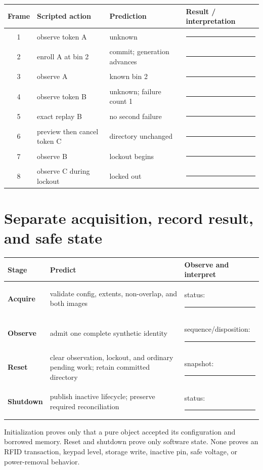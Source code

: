 \documentclass[11pt]{article}
\newcommand{\blankline}{\rule{0.9in}{0.4pt}}
\begin{document}
\begin{tabularx}{\linewidth}{@{}c l X X@{}}
\toprule
Frame & Scripted action & Prediction & Result / interpretation\\
\midrule
1 & observe token A & unknown & \blankline\\[5pt]
2 & enroll A at bin 2 & commit; generation advances & \blankline\\[5pt]
3 & observe A & known bin 2 & \blankline\\[5pt]
4 & observe token B & unknown; failure count 1 & \blankline\\[5pt]
5 & exact replay B & no second failure & \blankline\\[5pt]
6 & preview then cancel token C & directory unchanged & \blankline\\[5pt]
7 & observe B & lockout begins & \blankline\\[5pt]
8 & observe C during lockout & locked out & \blankline\\
\bottomrule
\end{tabularx}

\newpage
\section{Separate acquisition, record result, and safe state}
\begin{tabularx}{\linewidth}{@{}>{\bfseries}l X X@{}}
\toprule
Stage & Predict & Observe and interpret\\
\midrule
Acquire & validate config, extents, non-overlap, and both images & status:
\blankline\\[10pt]
Observe & admit one complete synthetic identity & sequence/disposition:
\blankline\\[10pt]
Reset & clear observation, lockout, and ordinary pending work; retain committed
directory & snapshot: \blankline\\[10pt]
Shutdown & publish inactive lifecycle; preserve required reconciliation &
status: \blankline\\
\bottomrule
\end{tabularx}

Initialization proves only that a pure object accepted its configuration and
borrowed memory. Reset and shutdown prove only software state. None proves an
RFID transaction, keypad level, storage write, inactive pin, safe voltage, or
power-removal behavior.
\end{document}
